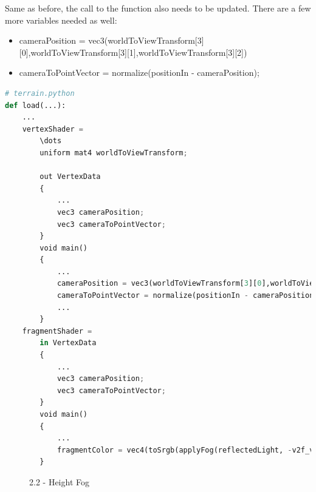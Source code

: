 \documentclass[a4 paper, 12pt]{article}
\begin{document}
Same as before, the call to the function also needs to be updated. There are a few more variables needed as well:
    \begin{itemize}
        \item cameraPosition = vec3(worldToViewTransform[3][0],worldToViewTransform[3][1],worldToViewTransform[3][2])
        \item cameraToPointVector = normalize(positionIn - cameraPosition);
    \end{itemize}


\begin{lstlisting}[language=python]
# terrain.python
def load(...):
    ...
    vertexShader =
        \dots
        uniform mat4 worldToViewTransform;

        out VertexData
        {
            ...
            vec3 cameraPosition;
            vec3 cameraToPointVector;
        }
        void main()
        {
            ...
            cameraPosition = vec3(worldToViewTransform[3][0],worldToViewTransform[3][1],worldToViewTransform[3][2])
            cameraToPointVector = normalize(positionIn - cameraPosition);
            ...
        }
    fragmentShader = 
        in VertexData
        {
            ...
            vec3 cameraPosition;
            vec3 cameraToPointVector;
        }
        void main()
        {
            ...
            fragmentColor = vec4(toSrgb(applyFog(reflectedLight, -v2f_viewSpacePosition.z, cameraPosition, cameraToPointVector)), 1.0);
        }
\end{lstlisting} 
\begin{figure} [H]
    \caption{2.2 - Height Fog}   
\end{figure}
\end{document}
